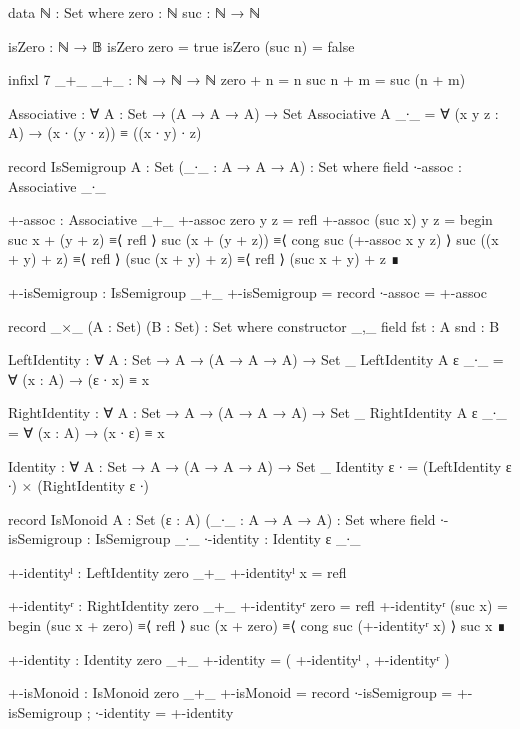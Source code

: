 \documentclass[./Thesis.tex]{subfiles}
\begin{document}
\begin{code}
  data ℕ : Set where
    zero : ℕ
    suc  : ℕ → ℕ

  isZero : ℕ → 𝔹
  isZero zero = true
  isZero (suc n) = false

  infixl 7 _+_
  _+_ : ℕ → ℕ → ℕ
  zero + n = n
  suc n + m = suc (n + m)

  Associative : ∀ {A : Set} → (A → A → A) → Set
  Associative {A} _∙_ = ∀ (x y z : A) → (x ∙ (y ∙ z)) ≡ ((x ∙ y) ∙ z)

  record IsSemigroup {A : Set} (_∙_ : A → A → A) : Set where
    field
      ∙-assoc : Associative _∙_

  +-assoc : Associative _+_
  +-assoc zero y z = refl
  +-assoc (suc x) y z = begin
    suc x + (y + z)   ≡⟨ refl ⟩
    suc (x + (y + z)) ≡⟨ cong suc (+-assoc x y z) ⟩
    suc ((x + y) + z) ≡⟨ refl ⟩
    (suc (x + y) + z) ≡⟨ refl ⟩
    (suc x + y) + z   ∎

  +-isSemigroup : IsSemigroup _+_
  +-isSemigroup = record { ∙-assoc = +-assoc }

  record _×_ (A : Set) (B : Set) : Set where
    constructor _,_
    field
      fst : A
      snd : B

  LeftIdentity : ∀ {A : Set} → A → (A → A → A) → Set _
  LeftIdentity {A} ε _∙_ = ∀ (x : A) → (ε ∙ x) ≡ x

  RightIdentity : ∀ {A : Set} → A → (A → A → A) → Set _
  RightIdentity {A} ε _∙_ = ∀ (x : A) → (x ∙ ε) ≡ x

  Identity : ∀ {A : Set} → A → (A → A → A) → Set _
  Identity ε ∙ = (LeftIdentity ε ∙) × (RightIdentity ε ∙)

  record IsMonoid {A : Set} (ε : A) (_∙_ : A → A → A) : Set where
    field
      ∙-isSemigroup : IsSemigroup _∙_
      ∙-identity : Identity ε _∙_

  +-identityˡ : LeftIdentity zero _+_
  +-identityˡ x = refl

  +-identityʳ : RightIdentity zero _+_
  +-identityʳ zero = refl
  +-identityʳ (suc x) = begin
    (suc x + zero) ≡⟨ refl ⟩
    suc (x + zero) ≡⟨ cong suc (+-identityʳ x) ⟩
    suc x          ∎

  +-identity : Identity zero _+_
  +-identity = ( +-identityˡ , +-identityʳ )

  +-isMonoid : IsMonoid zero _+_
  +-isMonoid = record { ∙-isSemigroup = +-isSemigroup ; ∙-identity = +-identity }
\end{code}

\begin{code}
\end{code}
\end{document}
